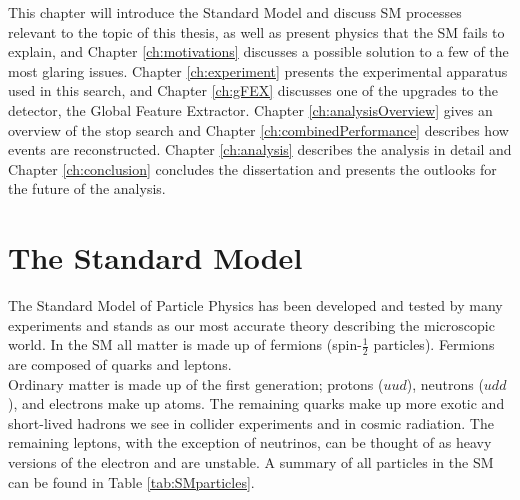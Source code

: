 This chapter will introduce the Standard Model and discuss SM processes relevant to the topic of this thesis, as well as present physics that the SM fails to explain, and Chapter \ref{ch:motivations} discusses a possible solution to a few of the most glaring issues.  Chapter \ref{ch:experiment} presents the experimental apparatus used in this search, and Chapter \ref{ch:gFEX} discusses one of the upgrades to the detector, the Global Feature Extractor.  Chapter \ref{ch:analysisOverview} gives an overview of the stop search and Chapter \ref{ch:combinedPerformance} describes how events are reconstructed.  Chapter \ref{ch:analysis} describes the analysis in detail and Chapter \ref{ch:conclusion} concludes the dissertation and presents the outlooks for the future of the analysis.  \\




\section{The Standard Model}

The Standard Model of Particle Physics has been developed and tested by many experiments and stands as our most accurate theory describing the microscopic world.  In the SM all matter is made up of fermions (spin-$\frac{1}{2} $ particles).  Fermions are composed of quarks and leptons.  \\%

Ordinary matter is made up of the first generation; protons ($uud$), neutrons ($udd$), and electrons make up atoms.  The remaining quarks make up more exotic and short-lived hadrons we see in collider experiments and in cosmic radiation.  The remaining leptons, with the exception of neutrinos, can be thought of as heavy versions of the electron and are unstable.  A summary of all particles in the SM can be found in Table \ref{tab:SMparticles}. \\

